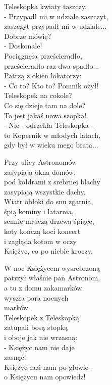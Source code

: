 \documentclass[11pt,a4pape,leqno,twoside]{book}
\begin{document}
Teleskopka kwiaty taszczy.\\
- Przypadł mi w udziale zaszczyt,\\
zaszczyt przypadł mi w udziale...\\
Dobrze mówię?\\
- Doskonale!\\
Pociągnęła prześcieradło,\\
prześcieradło raz-dwa spadło...\\
Patrzą z okien lokatorzy:\\
- Co to? Kto to? Pomnik ożył!\\
Teleskopek na cokole?\\
Co się dzieje tam na dole?\\
To jest jakaś nowa szopka!\\
- Nie - odrzekła Teleskopka -\\
to Kopernik w młodych latach,\\
gdy był w wieku mego brata...\\ \vspace{0.1cm}

Przy ulicy Astronomów\\
zasypiają okna domów,\\
pod kołdrami z srebrnej blachy\\
zasypiają wszystkie dachy.\\
Wiatr obłoki do snu zgarnia,\\
śpią kominy i latarnia,\\
sennie mruczą drzewa śpiące,\\
koty kończą koci koncert\\
i zagląda kotom w oczy\\
Księżyc, co po niebie kroczy.\\ \vspace{0.1cm}

W noc Księżycem wysrebrzoną\\
patrzył właśnie pan Astronom,\\
a tu z domu zakamarków\\
wyszła para nocnych\\
marków.\\
Teleskopek z Teleskopką\\
zatupali bosą stopką\\
i oboje jak nie wrzasną:\\
- Księżyc nam nie daje\\
zasnąć!\\
Księżyc łazi nam po głowie -\\
o Księżycu nam opowiedz!
\end{document}
